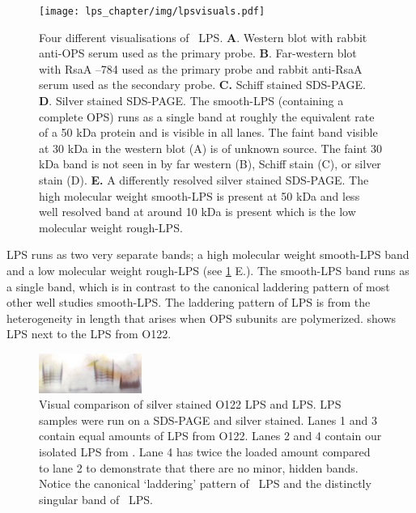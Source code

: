 \begin{figure}[htp]
  \begin{center}
    \texttt{[image: lps\_chapter/img/lpsvisuals.pdf]}
  \end{center}
  \caption[Four different visualisations of \caulobacter\ \ac{LPS}]{Four different visualisations
    of \caulobacter\ \ac{LPS}. \textbf{A}. Western blot with rabbit anti-\ac{OPS} serum used as
    the primary probe. \textbf{B}. Far-western blot with RsaA --784 used as the primary
    probe and rabbit anti-RsaA serum used as the secondary probe. \textbf{C.} Schiff stained
    \ac{SDS-PAGE}. \textbf{D}. Silver stained \ac{SDS-PAGE}. The smooth-\ac{LPS} (\ie containing a
    complete \ac{OPS}) runs as a single band at roughly the equivalent rate of a 50 kDa protein
    and is visible in all lanes. The faint band visible at 30 kDa in the western blot (A) is of
    unknown source. The faint 30 kDa band is not seen in by far western (B), Schiff stain (C), or
    silver stain (D). \textbf{E.} A differently resolved silver stained \ac{SDS-PAGE}. The high molecular weight smooth-\ac{LPS} is present at 50 kDa and less well resolved band at around 10 kDa is present which is the low molecular weight rough-\ac{LPS}.}
  \label{fig:lpsvisuals}
\end{figure}

 \caulobacter{} \ac{LPS} runs as two very separate bands; a high molecular weight smooth-\ac{LPS} band and a low molecular weight rough-\ac{LPS} (see \cref{fig:lpsvisuals} E.). The \caulobacter{} smooth-\ac{LPS} band runs as a single band, which is in contrast to the canonical laddering pattern of most other well studies smooth-\ac{LPS}. The laddering pattern of \ac{LPS} is from the heterogeneity in length that arises when \ac{OPS} subunits are polymerized.   shows \caulobacter{} \ac{LPS} next to the \ac{LPS} from \ecoli{} O122.   

\begin{figure}[htb]
  \begin{center}
    \includegraphics[width=0.3\textwidth]{lps_chapter/img/lpssilverstain.jpg}
  \end{center}
  \caption[Visual comparison of \ecoli O122 \ac{LPS} and \caulobacter \ac{LPS}]{Visual comparison
    of silver stained \ecoli O122 \ac{LPS} and \caulobacter \ac{LPS}. \ac{LPS} samples were run on
    a \ac{SDS-PAGE} and silver stained. Lanes 1 and 3 contain equal amounts of \ac{LPS} from
    \ecoli O122. Lanes 2 and 4 contain our isolated \ac{LPS} from \caulobacter. Lane 4 has twice
    the loaded amount compared to lane 2 to demonstrate that there are no minor, hidden
    bands. Notice the canonical `laddering' pattern of \ecoli\ \ac{LPS} and the distinctly
    singular band of \caulobacter\ \ac{LPS}.}
  \label{fig:lpssilverstain}
\end{figure}


